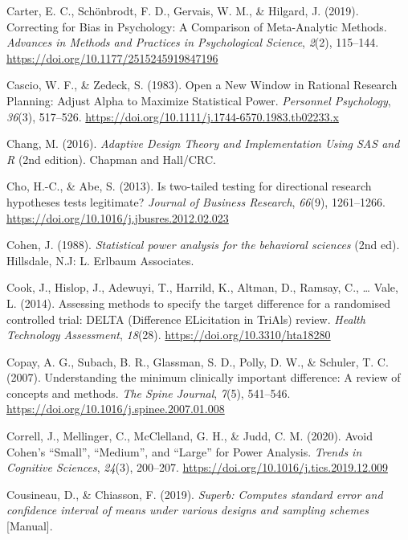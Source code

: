 \documentclass[
  english,
  ,jou, a4paper,floatsintext]{apa6}
\newlength{\cslhangindent}
\newenvironment{cslreferences}%
  {\setlength{\parindent}{0pt}%
  \everypar{\setlength{\hangindent}{\cslhangindent}}\ignorespaces}%
  {\par}
\begin{document}
\begin{cslreferences}
\leavevmode\hypertarget{ref-carter_correcting_2019}{}%
Carter, E. C., Schönbrodt, F. D., Gervais, W. M., \& Hilgard, J. (2019). Correcting for Bias in Psychology: A Comparison of Meta-Analytic Methods. \emph{Advances in Methods and Practices in Psychological Science}, \emph{2}(2), 115--144. \url{https://doi.org/10.1177/2515245919847196}

\leavevmode\hypertarget{ref-cascio_open_1983}{}%
Cascio, W. F., \& Zedeck, S. (1983). Open a New Window in Rational Research Planning: Adjust Alpha to Maximize Statistical Power. \emph{Personnel Psychology}, \emph{36}(3), 517--526. \url{https://doi.org/10.1111/j.1744-6570.1983.tb02233.x}

\leavevmode\hypertarget{ref-chang_adaptive_2016}{}%
Chang, M. (2016). \emph{Adaptive Design Theory and Implementation Using SAS and R} (2nd edition). Chapman and Hall/CRC.

\leavevmode\hypertarget{ref-cho_is_2013}{}%
Cho, H.-C., \& Abe, S. (2013). Is two-tailed testing for directional research hypotheses tests legitimate? \emph{Journal of Business Research}, \emph{66}(9), 1261--1266. \url{https://doi.org/10.1016/j.jbusres.2012.02.023}

\leavevmode\hypertarget{ref-cohen_statistical_1988}{}%
Cohen, J. (1988). \emph{Statistical power analysis for the behavioral sciences} (2nd ed). Hillsdale, N.J: L. Erlbaum Associates.

\leavevmode\hypertarget{ref-cook_assessing_2014}{}%
Cook, J., Hislop, J., Adewuyi, T., Harrild, K., Altman, D., Ramsay, C., \ldots{} Vale, L. (2014). Assessing methods to specify the target difference for a randomised controlled trial: DELTA (Difference ELicitation in TriAls) review. \emph{Health Technology Assessment}, \emph{18}(28). \url{https://doi.org/10.3310/hta18280}

\leavevmode\hypertarget{ref-copay_understanding_2007}{}%
Copay, A. G., Subach, B. R., Glassman, S. D., Polly, D. W., \& Schuler, T. C. (2007). Understanding the minimum clinically important difference: A review of concepts and methods. \emph{The Spine Journal}, \emph{7}(5), 541--546. \url{https://doi.org/10.1016/j.spinee.2007.01.008}

\leavevmode\hypertarget{ref-correll_avoid_2020}{}%
Correll, J., Mellinger, C., McClelland, G. H., \& Judd, C. M. (2020). Avoid Cohen's ``Small'', ``Medium'', and ``Large'' for Power Analysis. \emph{Trends in Cognitive Sciences}, \emph{24}(3), 200--207. \url{https://doi.org/10.1016/j.tics.2019.12.009}

\leavevmode\hypertarget{ref-cousineau_superb_2019}{}%
Cousineau, D., \& Chiasson, F. (2019). \emph{Superb: Computes standard error and confidence interval of means under various designs and sampling schemes} {[}Manual{]}.


\end{cslreferences}
\end{document}
